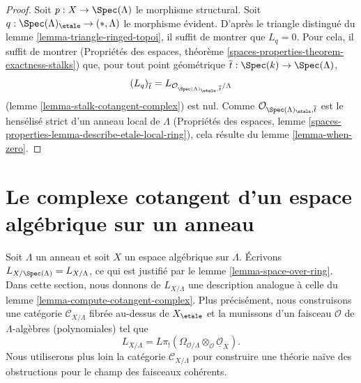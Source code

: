 \begin{proof}
Soit $p : X \to \Spec(\Lambda)$ le morphisme structural. Soit
$q : \Spec(\Lambda)_\etale \to (*, \Lambda)$ le morphisme évident. D'après le
triangle distingué du lemme \ref{lemma-triangle-ringed-topoi}, il suffit de
montrer que $L_q = 0$. Pour cela, il suffit de montrer (Propriétés des espaces,
théorème \ref{spaces-properties-theorem-exactness-stalks}) que, pour tout point
géométrique $\overline{t} : \Spec(k) \to \Spec(\Lambda)$,
$$
(L_q)_{\overline{t}} =
L_{\mathcal{O}_{\Spec(\Lambda)_\etale, \overline{t}}/\Lambda}
$$
(lemme \ref{lemma-stalk-cotangent-complex}) est nul. Comme
$\mathcal{O}_{\Spec(\Lambda)_\etale, \overline{t}}$ est le hensélisé strict
d'un anneau local de $\Lambda$ (Propriétés des espaces, lemme
\ref{spaces-properties-lemma-describe-etale-local-ring}), cela résulte du lemme
\ref{lemma-when-zero}.
\end{proof}










\section{Le complexe cotangent d'un espace algébrique sur un anneau}
\label{section-cotangent-spaces-variant}

\noindent
Soit $\Lambda$ un anneau et soit $X$ un espace algébrique sur $\Lambda$.
Écrivons $L_{X/\Spec(\Lambda)} = L_{X/\Lambda}$, ce qui est justifié par le
lemme \ref{lemma-space-over-ring}. Dans cette section, nous donnons de
$L_{X/\Lambda}$ une description analogue à celle du lemme
\ref{lemma-compute-cotangent-complex}. Plus précisément, nous construisons une
catégorie $\mathcal{C}_{X/\Lambda}$ fibrée au-dessus de $X_\etale$ et la
munissons d'un faisceau $\mathcal{O}$ de $\Lambda$-algèbres (polynomiales) tel
que
$$
L_{X/\Lambda} =
L\pi_!(\Omega_{\mathcal{O}/\underline{\Lambda}} \otimes_\mathcal{O}
\underline{\mathcal{O}}_X).
$$
Nous utiliserons plus loin la catégorie $\mathcal{C}_{X/\Lambda}$ pour
construire une théorie naïve des obstructions pour le champ des faisceaux
cohérents.


